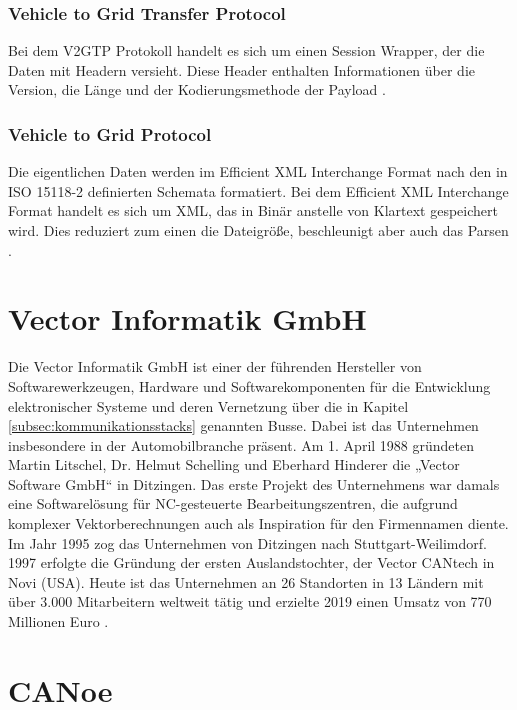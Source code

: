 \subsubsection{Vehicle to Grid Transfer Protocol}\label{subsec:v2g}

Bei dem V2GTP Protokoll handelt es sich um einen Session Wrapper, der die Daten mit Headern versieht. Diese Header enthalten Informationen über die Version, die Länge und der Kodierungsmethode der Payload \cite[S. 27]{masterIso15118}.

\subsubsection{Vehicle to Grid Protocol}\label{subsec:v2g}

Die eigentlichen Daten werden im Efficient XML Interchange Format nach den in ISO 15118-2 definierten Schemata formatiert.
Bei dem Efficient XML Interchange Format handelt es sich um XML, das in Binär anstelle von Klartext gespeichert wird. Dies reduziert zum einen die Dateigröße, beschleunigt aber auch das Parsen \cite[]{exi}.

\section{Vector Informatik GmbH}\label{subsec:vectorunternehmen}

Die Vector Informatik GmbH ist einer der führenden Hersteller von Softwarewerkzeugen, Hardware und Softwarekomponenten für die Entwicklung elektronischer Systeme und deren Vernetzung über die in Kapitel \ref{subsec:kommunikationsstacks} genannten Busse. Dabei ist das Unternehmen insbesondere in der Automobilbranche präsent. Am 1. April 1988 gründeten Martin Litschel, Dr. Helmut Schelling und Eberhard Hinderer die „Vector Software GmbH“ in Ditzingen. Das erste Projekt des Unternehmens war damals eine Softwarelösung für NC-gesteuerte Bearbeitungszentren, die aufgrund komplexer Vektorberechnungen auch als Inspiration für den Firmennamen diente. Im Jahr 1995 zog das Unternehmen von Ditzingen nach Stuttgart-Weilimdorf. 1997 erfolgte die Gründung der ersten Auslandstochter, der Vector CANtech in Novi (USA). Heute ist das Unternehmen an 26 Standorten in 13 Ländern mit über 3.000 Mitarbeitern weltweit tätig und erzielte 2019 einen Umsatz von 770 Millionen Euro \cite[]{firmengeschichte}.

\section{CANoe}\label{subsec:canoe}

